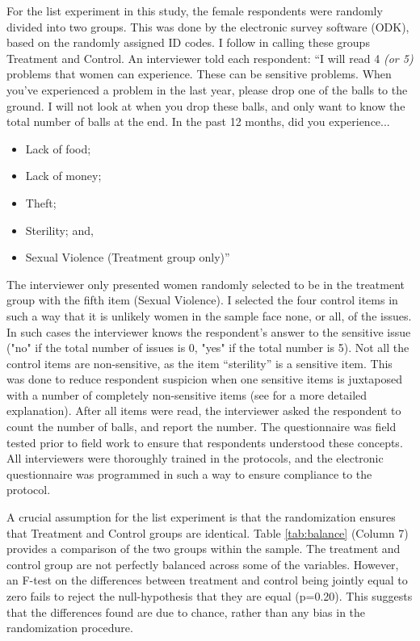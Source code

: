For the list experiment in this study, the female respondents were randomly divided into two groups. This was done by the electronic survey software (ODK), based on the randomly assigned ID codes. I follow \cite{Imai2011} in calling these groups Treatment and Control. An interviewer told each respondent: ``I will read 4 \textit{(or 5)} problems that women can experience. These can be sensitive problems. When you've experienced a problem in the last year, please drop one of the balls to the ground. I will not look at when you drop these balls, and only want to know the total number of balls at the end. In the past 12 months, did you experience...
\begin{itemize}
	\item Lack of food;
	\item Lack of money;
	\item Theft;
	\item Sterility; and,
	\item Sexual Violence (Treatment group only)'' %
\end{itemize}

The interviewer only presented women randomly selected to be in the treatment group with the fifth item (Sexual Violence). I selected the four control items in such a way that it is unlikely women in the sample face none, or all, of the issues. In such cases the interviewer knows the respondent's answer to the sensitive issue ("no" if the total number of issues is 0, "yes" if the total number is 5). Not all the control items are non-sensitive, as the item ``sterility'' is a sensitive item. This was done to reduce respondent suspicion when one sensitive items is juxtaposed with a number of completely non-sensitive items (see \citet{Chuang2019} for a more detailed explanation). After all items were read, the interviewer asked the respondent to count the number of balls, and report the number. The questionnaire was field tested prior to field work to ensure that respondents understood these concepts. All interviewers were thoroughly trained in the protocols, and the electronic questionnaire was programmed in such a way to ensure compliance to the protocol.

A crucial assumption for the list experiment is that the randomization ensures that Treatment and Control groups are identical. Table \ref{tab:balance} (Column 7) provides a comparison of the two groups within the sample. The treatment and control group are not perfectly balanced across some of the variables. However, an F-test on the differences between treatment and control being jointly equal to zero fails to reject the null-hypothesis that they are equal (p=0.20). This suggests that the differences found are due to chance, rather than any bias in the randomization procedure.

